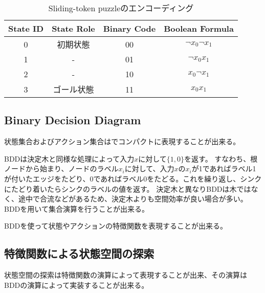 \begin{table}
\centering
\caption{Sliding-token puzzleのエンコーディング}
\label{tbl:sliding-token}
\begin{tabular}{c|c|c|c}
	State ID & State Role & Binary Code & Boolean Formula \\ \hline
	0		& 初期状態	& 00				& $\lnot x_0 \lnot x_1$ \\	
	1		& -			& 01				& $\lnot x_0  x_1$ \\	
	2		& -			& 10				& $x_0 \lnot x_1$ \\	
	3		& ゴール状態	& 11				& $x_0 x_1$ \\	
\end{tabular}
\end{table}


\subsection{Binary Decision Diagram}
\label{sec:binary-decision-diagram}

状態集合およびアクション集合はでコンパクトに表現することが出来る。


BDDは決定木と同様な処理によって入力$x$に対して$\{1, 0\}$を返す。
すなわち、根ノードから始まり、ノードのラベル$x_i$に対して、入力$x$の$x_i$が1であればラベル1が付いたエッジをたどり、0であればラベル0をたどる。これを繰り返し、シンクにたどり着いたらシンクのラベルの値を返す。
決定木と異なりBDDは木ではなく、途中で合流などがあるため、決定木よりも空間効率が良い場合が多い。
BDDを用いて集合演算を行うことが出来る。



BDDを使って状態やアクションの特徴関数を表現することが出来る。

\subsection{特徴関数による状態空間の探索}

状態空間の探索は特徴関数の演算によって表現することが出来、その演算はBDDの演算によって実装することが出来る。

